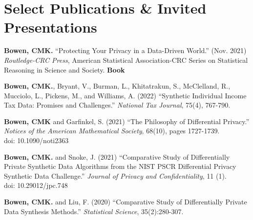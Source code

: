 \documentclass[11pt, letterpaper, roman]{moderncv} %
\begin{document}

\newpage
\section{Select Publications \& Invited Presentations}
\begin{etaremune}[topsep=0pt, itemsep=4pt, partopsep=0pt, parsep=0pt]

    \item \textbf{Bowen, CMK.} ``Protecting Your Privacy in a Data-Driven World.'' (Nov. 2021) \textit{Routledge-CRC Press}, American Statistical Association-CRC Series on Statistical Reasoning in Science and Society. \textbf{Book}
    
    \item \textbf{Bowen, CMK.}, Bryant, V., Burman, L., Khitatrakun, S., McClelland, R., Mucciolo, L., Pickens, M., and Williams, A. (2022) ``Synthetic Individual Income Tax Data: Promises and Challenges.'' \textit{National Tax Journal}, 75(4), 767-790.
    
    \item \textbf{Bowen, CMK} and Garfinkel, S. (2021) ``The Philosophy of Differential Privacy.'' \textit{Notices of the American Mathematical Society}, 68(10), pages 1727-1739.\\
    doi: 10.1090/noti2363

    \item \textbf{Bowen, CMK.} and Snoke, J. (2021) ``Comparative Study of Differentially Private Synthetic Data Algorithms from the NIST PSCR Differential Privacy Synthetic Data Challenge.'' \textit{Journal of Privacy and Confidentiality}, 11 (1).\\
    doi: 10.29012/jpc.748

    \item \textbf{Bowen, CMK.} and Liu, F. (2020) ``Comparative Study of Differentially Private Data Synthesis Methods.'' \textit{Statistical Science}, 35(2):280-307.

\end{etaremune}
\end{document}
